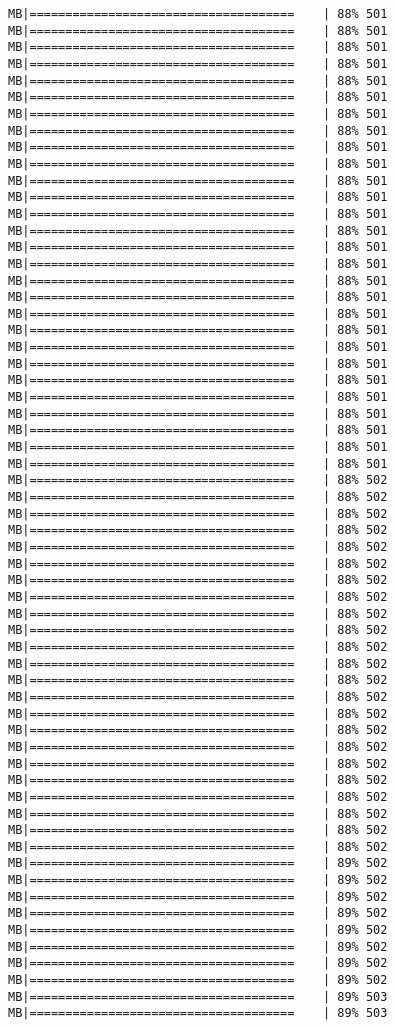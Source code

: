 \documentclass[
]{article}
\begin{document}
\begin{verbatim}
MB|=====================================    | 88% 501 MB|=====================================    | 88% 501 MB|=====================================    | 88% 501 MB|=====================================    | 88% 501 MB|=====================================    | 88% 501 MB|=====================================    | 88% 501 MB|=====================================    | 88% 501 MB|=====================================    | 88% 501 MB|=====================================    | 88% 501 MB|=====================================    | 88% 501 MB|=====================================    | 88% 501 MB|=====================================    | 88% 501 MB|=====================================    | 88% 501 MB|=====================================    | 88% 501 MB|=====================================    | 88% 501 MB|=====================================    | 88% 501 MB|=====================================    | 88% 501 MB|=====================================    | 88% 501 MB|=====================================    | 88% 501 MB|=====================================    | 88% 501 MB|=====================================    | 88% 501 MB|=====================================    | 88% 501 MB|=====================================    | 88% 501 MB|=====================================    | 88% 501 MB|=====================================    | 88% 501 MB|=====================================    | 88% 501 MB|=====================================    | 88% 501 MB|=====================================    | 88% 501 MB|=====================================    | 88% 502 MB|=====================================    | 88% 502 MB|=====================================    | 88% 502 MB|=====================================    | 88% 502 MB|=====================================    | 88% 502 MB|=====================================    | 88% 502 MB|=====================================    | 88% 502 MB|=====================================    | 88% 502 MB|=====================================    | 88% 502 MB|=====================================    | 88% 502 MB|=====================================    | 88% 502 MB|=====================================    | 88% 502 MB|=====================================    | 88% 502 MB|=====================================    | 88% 502 MB|=====================================    | 88% 502 MB|=====================================    | 88% 502 MB|=====================================    | 88% 502 MB|=====================================    | 88% 502 MB|=====================================    | 88% 502 MB|=====================================    | 88% 502 MB|=====================================    | 88% 502 MB|=====================================    | 88% 502 MB|=====================================    | 88% 502 MB|=====================================    | 89% 502 MB|=====================================    | 89% 502 MB|=====================================    | 89% 502 MB|=====================================    | 89% 502 MB|=====================================    | 89% 502 MB|=====================================    | 89% 502 MB|=====================================    | 89% 502 MB|=====================================    | 89% 502 MB|=====================================    | 89% 503 MB|=====================================    | 89% 503 
\end{verbatim}
\end{document}
